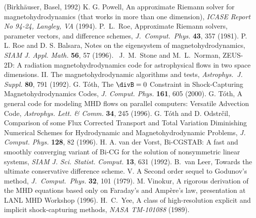 \begin{thebibliography}{33}
    (Birkh\"auser, Basel, 1992)
    K. G. Powell, 
    An approximate Riemann solver for magnetohydrodynamics
    (that works in more than one dimension),
    {\it ICASE Report No 94-24, Langley, VA} (1994).
    P.\ L.\ Roe,
    Approximate Riemann solvers, parameter vectors, 
    and difference schemes,
    {\it J.\ Comput.\ Phys.} {\bf 43}, 357 (1981).
    P. L. Roe and D. S. Balsara, 
    Notes on the eigensystem of magnetohydrodynamics,
    {\it SIAM J. Appl. Math.} {\bf 56}, 57 (1996).\
    J.\ M.\ Stone and M.\ L.\ Norman, 
    ZEUS-2D: A radiation magnetohydrodynamics code for 
    astrophysical flows in two space dimensions.
    II. The magnetohydrodynamic algorithms and tests,
    {\it Astrophys.\ J. Suppl.} {\bf 80}, 791 (1992).
    G. T\'oth,
    The $\divB=0$ Constraint in Shock-Capturing Magnetohydrodynamics Codes,
    {\it J. Comput. Phys.} {\bf 161}, 605 (2000).
    G. T\'oth,
    A general code for modeling MHD flows on parallel computers:
    Versatile Advection Code,
    {\it Astrophys. Lett. \& Comm.} {\bf 34}, 245 (1996).
    G. T\'oth and D. Odstr\v cil,
    Comparison of some Flux Corrected Transport
    and Total Variation Diminishing Numerical Schemes
    for Hydrodynamic and Magnetohydrodynamic Problems,
    {\it J. Comput. Phys.} {\bf 128}, 82 (1996).
    H. A. van der Vorst,
    Bi-CGSTAB: A fast and smoothly converging variant of Bi-CG
    for the solution of nonsymmetric linear systems,
    {\it SIAM J. Sci. Statist. Comput.} {\bf 13}, 631 (1992).
    B.\ van Leer,
    Towards the ultimate conservative difference scheme. 
    V. A Second order sequel to Godunov's method,
    {\it J.\ Comput.\ Phys.} {\bf 32}, 101 (1979).
    M. Vinokur,
    A rigorous derivation of the MHD equations based only on 
    Faraday's and Amp\`ere's law,
    presentation at LANL MHD Workshop (1996).
    H.\ C.\ Yee,
    A class of high-resolution explicit and implicit shock-capturing methods,
    {\it NASA TM-101088} (1989).

\end{thebibliography}


